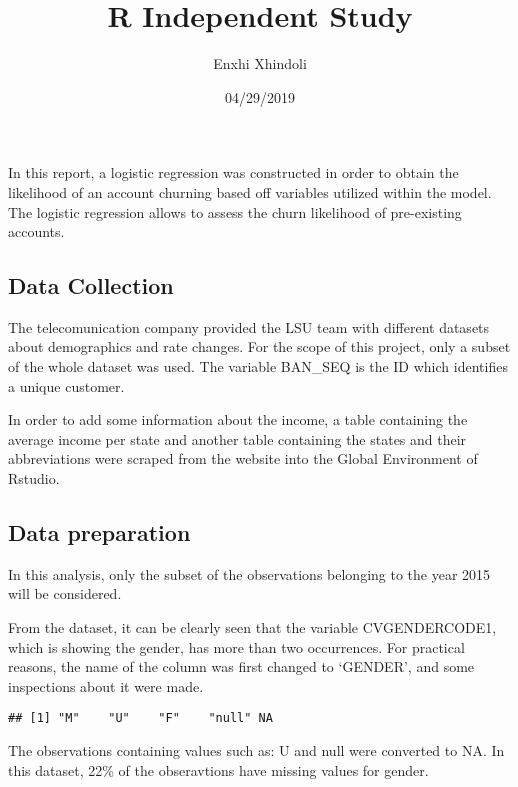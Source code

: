 \documentclass[]{article}
\title{R Independent Study}
\author{Enxhi Xhindoli}
\date{04/29/2019}
\newenvironment{Shaded}{\begin{snugshade}}{\end{snugshade}}
\newcommand{\KeywordTok}[1]{\textcolor[rgb]{0.13,0.29,0.53}{\textbf{#1}}}
\newcommand{\OperatorTok}[1]{\textcolor[rgb]{0.81,0.36,0.00}{\textbf{#1}}}
\newcommand{\NormalTok}[1]{#1}
\begin{document}
\maketitle

In this report, a logistic regression was constructed in order to obtain
the likelihood of an account churning based off variables utilized
within the model. The logistic regression allows to assess the churn
likelihood of pre-existing accounts.

\subsection{Data Collection}\label{data-collection}

The telecomunication company provided the LSU team with different
datasets about demographics and rate changes. For the scope of this
project, only a subset of the whole dataset was used. The variable
BAN\_SEQ is the ID which identifies a unique customer.

In order to add some information about the income, a table containing
the average income per state and another table containing the states and
their abbreviations were scraped from the website into the Global
Environment of Rstudio.

\subsection{Data preparation}\label{data-preparation}

In this analysis, only the subset of the observations belonging to the
year 2015 will be considered.

From the dataset, it can be clearly seen that the variable
CVGENDERCODE1, which is showing the gender, has more than two
occurrences. For practical reasons, the name of the column was first
changed to `GENDER', and some inspections about it were made.

\begin{Shaded}
\end{Shaded}

\begin{verbatim}
## [1] "M"    "U"    "F"    "null" NA
\end{verbatim}

The observations containing values such as: U and null were converted to
NA. In this dataset, 22\% of the obseravtions have missing values for
gender.
\end{document}
